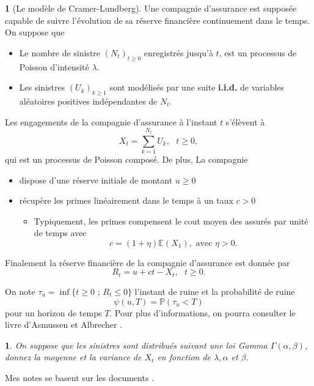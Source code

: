 \documentclass[8pt,notheorems]{beamer}
\def \E{\mathbb E}
\renewcommand{\Pr}{\mathbb{P}}
\newtheorem{problem}{\translate{Problème}}
\theoremstyle{definition}
\theoremstyle{example}
\newtheorem{example}{\translate{Exemple}}
\theoremstyle{mystyle}
\theoremstyle{plain}
\begin{document}
\begin{frame}[allowframebreaks]
\begin{example}[Le modèle de Cramer-Lundberg]
Une compagnie d'assurance est supposée capable de suivre l'évolution de sa réserve financière continuement dans le temps. On suppose que
\begin{itemize}
\item Le nombre de sinistre $(N_t)_{t\geq0}$ enregistrés jusqu'à $t$, est un processus de Poisson d'intensité $\lambda$.
\item Les sinistres $(U_k)_{k\geq1}$ sont modélisés par une suite \textbf{i.i.d.} de variables aléatoires positives indépendantes de $N_t$.
\end{itemize}
Les engagements de la compagnie d'assurance à l'instant $t$ s'élèvent à
$$X_t=\sum_{k=1}^{N_t}U_k,\text{  }t\geq0,$$
qui est un processus de Poisson composé. De plus, La compagnie
\begin{itemize}
  \item dispose d'une réserve initiale de montant $u\geq0$
  \item récupère les primes linéairement dans le temps à un taux $c>0$
  \begin{itemize}
    \item Typiquement, les primes compensent le cout moyen des assurés par unité de temps avec
     $$c=(1+\eta)\E(X_1),\text{ avec }\eta>0.$$
  \end{itemize}
\end{itemize}
Finalement la réserve financière de la compagnie d'assurance est donnée par
$$
R_t=u+ct-X_t,\text{ }t\geq0.
$$
\end{example}
On note $\tau_u=\inf\{t\geq0\text{ ; }R_t\leq0\}$ l'instant de ruine et la probabilité de ruine
$$
\psi(u, T)=\Pr(\tau_u<T)
$$
pour un horizon de temps $T$. Pour plus d'informations, on pourra consulter le livre d'Asmussen et Albrecher \cite{AsAl10}.
\begin{problem}
On suppose que les sinistres sont distribués suivant une loi Gamma $\Gamma(\alpha,\beta)$, donnez la moyenne et la variance de $X_t$ en fonction de $\lambda,\alpha$ et $\beta$.
\end{problem}
\end{frame}
\begin{frame}
Mes notes se basent sur les documents \cite{TruquetEnsai,Nabil17,Hohn}.


\end{frame}
\end{document}
